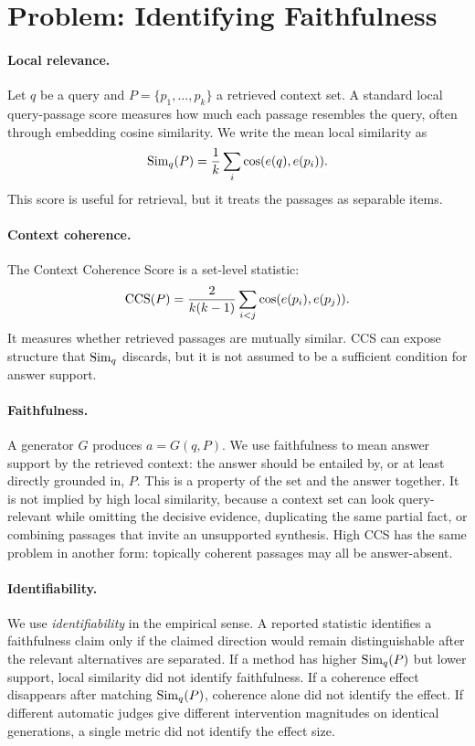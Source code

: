 \section{Problem: Identifying Faithfulness}

\paragraph{Local relevance.}
Let $q$ be a query and $P=\{p_1,\ldots,p_k\}$ a retrieved context set. A
standard local query-passage score measures how much each passage resembles
the query, often through embedding cosine similarity. We write the mean local
similarity as
\[
  \mathrm{Sim}_{q}(P)=\frac{1}{k}\sum_i \cos(e(q),e(p_i)).
\]
This score is useful for retrieval, but it treats the passages as separable
items.

\paragraph{Context coherence.}
The Context Coherence Score is a set-level statistic:
\[
  \mathrm{CCS}(P)=\frac{2}{k(k-1)}\sum_{i<j}\cos(e(p_i),e(p_j)).
\]
It measures whether retrieved passages are mutually similar. CCS can expose
structure that $\mathrm{Sim}_{q}$ discards, but it is not assumed to be a sufficient
condition for answer support.

\paragraph{Faithfulness.}
A generator $G$ produces $a=G(q,P)$. We use faithfulness to mean answer support
by the retrieved context: the answer should be entailed by, or at least
directly grounded in, $P$. This is a property of the set and the answer
together. It is not implied by high local similarity, because a context set can
look query-relevant while omitting the decisive evidence, duplicating the same
partial fact, or combining passages that invite an unsupported synthesis.
High CCS has the same problem in another form: topically coherent passages may
all be answer-absent.

\paragraph{Identifiability.}
We use \emph{identifiability} in the empirical sense. A reported statistic
identifies a faithfulness claim only if the claimed direction would remain
distinguishable after the relevant alternatives are separated. If a method has
higher $\mathrm{Sim}_{q}(P)$ but lower support, local similarity did not identify
faithfulness. If a coherence effect disappears after matching $\mathrm{Sim}_{q}(P)$,
coherence alone did not identify the effect. If different automatic judges
give different intervention magnitudes on identical generations, a single
metric did not identify the effect size.

